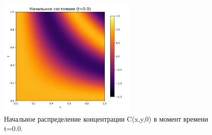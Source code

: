 \documentclass[a4paper,12pt]{article}
\begin{document}
\begin{figure}[H]
    \centering
    \includegraphics[width=0.6\textwidth]{comparison_results/initial_state.png}
    \caption{Начальное распределение концентрации C(x,y,0) в момент времени t=0.0.}
    \label{fig:initial}
\end{figure}
\end{document}
